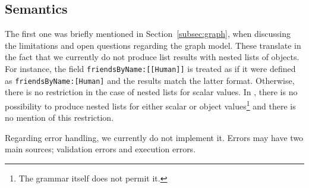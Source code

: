 \subsection{Semantics}


The first one was briefly mentioned in Section~\ref{subsec:graph}, when discussing the limitations and open questions regarding the graph model. These translate in the fact that we currently do not produce list results with nested lists of objects. For instance, the field \texttt{friendsByName:[[Human]]} is treated as if it were defined as \texttt{friendsByName:[Human]} and the results match the latter format. Otherwise, there is no restriction in the case of nested lists for scalar values. In \HP, there is no possibility to produce nested lists for either scalar or object values\footnote{The grammar itself does not permit it.} and there is no mention of this restriction.

Regarding error handling, we currently do not implement it. Errors may have two main sources; validation errors and execution errors.





